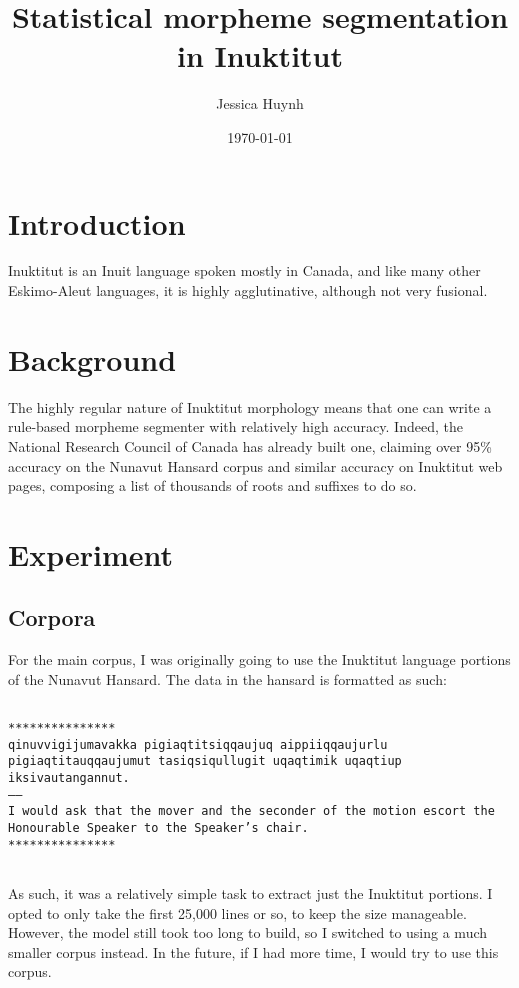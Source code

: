 \documentclass[10pt]{article}
\title{Statistical morpheme segmentation in Inuktitut}
\author{Jessica Huynh}
\date{\today}
\begin{document}
	
\maketitle

\onehalfspacing

\section{Introduction}
Inuktitut is an Inuit language spoken mostly in Canada, and like many other Eskimo-Aleut languages, it is highly agglutinative, although not very fusional.\cite{syllabics}

\section{Background}
The highly regular nature of Inuktitut morphology means that one can write a rule-based morpheme segmenter with relatively high accuracy. Indeed, the National Research Council of Canada has already built one, claiming over 95\% accuracy on the Nunavut Hansard corpus and similar accuracy on Inuktitut web pages, composing a list of thousands of roots and suffixes to do so.\cite{analyzer}

\section{Experiment}

\subsection{Corpora}
For the main corpus, I was originally going to use the Inuktitut language portions of the Nunavut Hansard.\cite{hansard} The data in the hansard is formatted as such:

\texttt{~\\***************\\qinuvvigijumavakka pigiaqtitsiqqaujuq aippiiqqaujurlu pigiaqtitauqqaujumut tasiqsiqullugit uqaqtimik uqaqtiup iksivautangannut.\\-----\\I would ask that the mover and the seconder of the motion escort the Honourable Speaker to the Speaker's chair.\\***************\\~}

As such, it was a relatively simple task to extract just the Inuktitut portions. I opted to only take the first 25,000 lines or so, to keep the size manageable. However, the model still took too long to build, so I switched to using a much smaller corpus instead. In the future, if I had more time, I would try to use this corpus.
\end{document}
